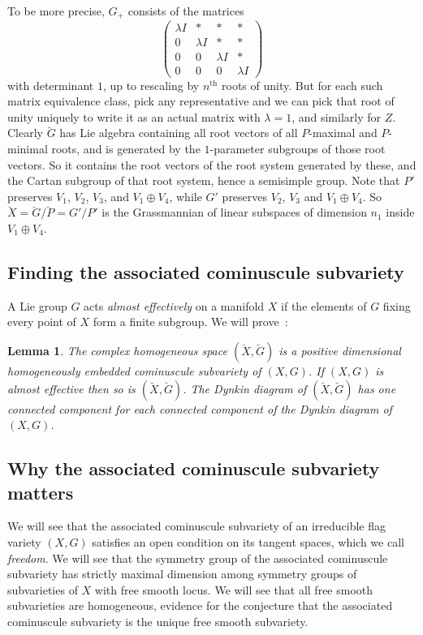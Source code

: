 \documentclass[a4paper,10pt]{amsart}
\newtheorem{lemma}{Lemma}
\theoremstyle{remark}
\begin{document}
To be more precise, \(G_+\) consists of the matrices 
\[
\begin{pmatrix}
\lambda I&*&*&*\\
0&\lambda I&*&*\\
0&0&\lambda I&*\\
0&0&0&\lambda I
\end{pmatrix}
\]
with determinant \(1\), up to rescaling by \(n^{\text{th}}\) roots of unity.
But for each such matrix equivalence class, pick any representative and we can pick that root of unity uniquely to write it as an actual matrix with \(\lambda=1\), and similarly for \(Z\).
Clearly \(\breve{G}\) has Lie algebra containing all root vectors of all \(P\)-maximal and \(P\)-minimal roots, and is generated by the \(1\)-parameter subgroups of those root vectors.
So it contains the root vectors of the root system generated by these, and the Cartan subgroup of that root system, hence a semisimple group.
Note that \(P'\) preserves \(V_1\), \(V_2\), \(V_3\), and \(V_1\oplus V_4\), while
\(G'\) preserves \(V_2\), \(V_3\) and \(V_1\oplus V_4\).
So \(\breve{X}=\breve{G}/\breve{P}=G'/P'\) is the Grassmannian of linear subspaces of dimension \(n_1\) inside \(V_1\oplus V_4\).

\subsection{Finding the associated cominuscule subvariety}
A Lie group \(G\) acts \emph{almost effectively} on a manifold \(X\) if the elements of \(G\) fixing every point of \(X\) form a finite subgroup.
We will prove~:
\begin{lemma}\label{lemma:associated.cominuscule}
The complex homogeneous space \((\breve{X},\breve{G})\) is a positive dimensional homogeneously embedded cominuscule subvariety of \((X,G)\).
If \((X,G)\) is almost effective then so is \((\breve{X},\breve{G})\).
The Dynkin diagram of \((\breve{X},\breve{G})\) has one connected component for each connected component of the Dynkin diagram of \((X,G)\).
\end{lemma}
\subsection{Why the associated cominuscule subvariety matters}
We will see  that the associated cominuscule subvariety of an irreducible flag variety \((X,G)\) satisfies an open condition on its tangent spaces, which we call \emph{freedom}.
We will see that the symmetry group of the associated cominuscule subvariety has strictly maximal dimension among symmetry groups of subvarieties of \(X\) with free smooth locus.
We will see that all free smooth subvarieties are homogeneous, evidence for the conjecture that the associated cominuscule subvariety is the unique free smooth subvariety.
\newpage
\end{document}
